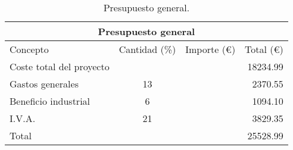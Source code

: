 \begin{table}[!htb]
\centering
\begin{tabular}{lcrr}
\toprule
\multicolumn{4}{c}{Presupuesto general}\\
\midrule
Concepto & Cantidad (\%) & Importe (\euro) & Total (\euro)\\
\midrule
Coste total del proyecto & & & 18234.99\\
Gastos generales & 13 & & 2370.55\\
Beneficio industrial & 6 & & 1094.10\\
I.V.A. & 21 & & 3829.35\\
\bottomrule
Total & & & 25528.99\\
\bottomrule
\end{tabular}
\caption{Presupuesto general.}
\label{presupuestogeneral}
\end{table}
